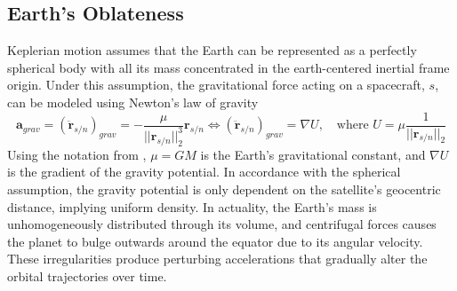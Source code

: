 \subsection{Earth's Oblateness}
\label{sec:oblateness}
Keplerian motion assumes that the Earth can be represented as a perfectly spherical body with all its mass concentrated in the earth-centered inertial frame origin. Under this assumption, the gravitational force acting on a spacecraft, $s$, can be modeled using Newton's law of gravity
\begin{equation}
    \textbf{a}_{grav} = \left(\ddot{\textbf{r}}_{s/n}\right)_{grav} = - \frac{\mu}{||\textbf{r}_{s/n}||_2^3} \textbf{r}_{s/n} \iff \left(\ddot{\textbf{r}}_{s/n}\right)_{grav} = \nabla U, \quad \text{where } U = \mu\frac{1}{||\textbf{r}_{s/n}||_2}
\label{eq:newton_gravity}
\end{equation}
Using the notation from \cite{hystad2025}, $\mu = GM$ is the Earth's gravitational constant, and $\nabla U$ is the gradient of the gravity potential. In accordance with the spherical assumption, the gravity potential is only dependent on the satellite's geocentric distance, implying uniform density. In actuality, the Earth's mass is unhomogeneously distributed through its volume, and centrifugal forces causes the planet to bulge outwards around the equator due to its angular velocity. These irregularities produce perturbing accelerations that gradually alter the orbital trajectories over time. 

